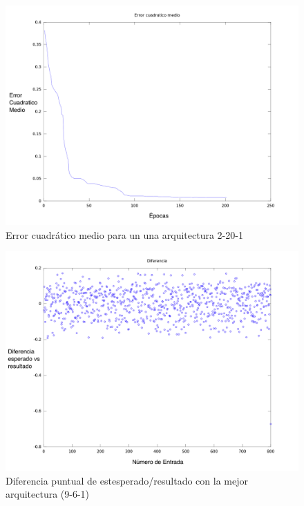 \documentclass[11pt]{article}
\begin{document}
        \begin{figure}[htbp]
            \centering
    			\includegraphics[width=1.0\textwidth]{img/20-1/ecm.png}
			\caption{Error cuadrático medio para un una arquitectura 2-20-1}
			\label{fig:201}
		\end{figure}
        
        \begin{figure}[htbp]
            \centering
        		\includegraphics[width=1.0\textwidth]{img/9-6-1/diferencia_final.png}
			\caption{Diferencia puntual de estesperado/resultado con la mejor arquitectura (9-6-1)}
			\label{fig:961diff}
		\end{figure}
        
\end{document}
